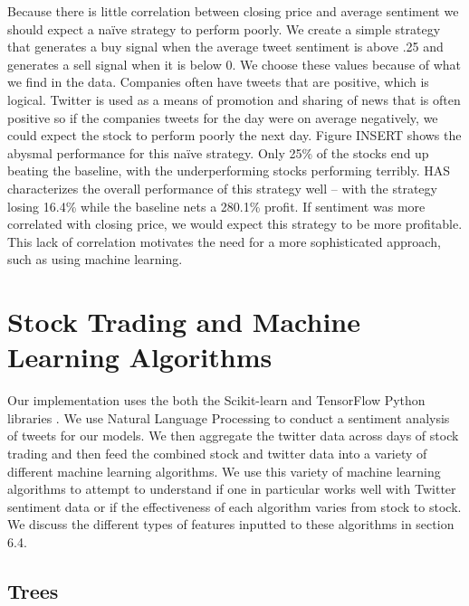 \documentclass[../thesis.tex]{subfiles}
\begin{document}
Because there is little correlation between closing price and average sentiment we should expect a na\"{i}ve strategy to perform poorly. We create a simple strategy that generates a buy signal when the average tweet sentiment is above .25 and generates a sell signal when it is below 0. We choose these values because of what we find in the data. Companies often have tweets that are positive, which is logical. Twitter is used as a means of promotion and sharing of news that is often positive so if the companies tweets for the day were on average negatively, we could expect the stock to perform poorly the next day. Figure INSERT shows the abysmal performance for this na\"{i}ve strategy. Only 25\% of the stocks end up beating the baseline, with the underperforming stocks performing terribly. HAS characterizes the overall performance of this strategy well -- with the strategy losing 16.4\% while the baseline nets a 280.1\% profit. If sentiment was more correlated with closing price, we would expect this strategy to be more profitable. This lack of correlation motivates the need for a more sophisticated approach, such as using machine learning. 



\section{Stock Trading and Machine Learning Algorithms}

Our implementation uses the both the Scikit-learn and TensorFlow Python libraries \cite{PedregosaFABIANPEDREGOSA2011} \cite{Abadi}. We use Natural Language Processing to conduct a sentiment analysis of tweets for our models. We then aggregate the twitter data across days of stock trading and then feed the combined stock and twitter data into a variety of different machine learning algorithms.  We use this variety of machine learning algorithms to attempt to understand if one in particular works well with Twitter sentiment data or if the effectiveness of each algorithm varies from stock to stock. We discuss the different types of features inputted to these algorithms in section 6.4.

\subsection{Trees}
\end{document}
